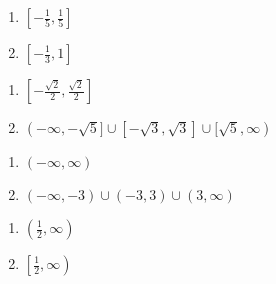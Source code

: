 \documentclass{ximera}
\begin{document}
\begin{multicols}{2}

\begin{enumerate}

\setcounter{enumi}{\value{HW}}

\item  $\left[-\frac{1}{5}, \frac{1}{5}\right]$
\item  $\left[-\frac{1}{3}, 1 \right]$

\setcounter{HW}{\value{enumi}}

\end{enumerate}

\end{multicols}

\begin{multicols}{2}

\begin{enumerate}

\setcounter{enumi}{\value{HW}}

\item   $\left[-\frac{\sqrt{2}}{2}, \frac{\sqrt{2}}{2}\right]$ 
\item  $(-\infty, -\sqrt{5}] \cup [-\sqrt{3}, \sqrt{3}] \cup [\sqrt{5}, \infty)$ 

\setcounter{HW}{\value{enumi}}

\end{enumerate}

\end{multicols}

\begin{multicols}{2}

\begin{enumerate}

\setcounter{enumi}{\value{HW}}

\item $(-\infty, \infty)$
\item  $(-\infty, -3) \cup (-3,3) \cup (3, \infty)$

\setcounter{HW}{\value{enumi}}

\end{enumerate}

\end{multicols}

\begin{multicols}{2}

\begin{enumerate}

\setcounter{enumi}{\value{HW}}

\item  $\left(\frac{1}{2}, \infty \right)$
\item  $\left[\frac{1}{2}, \infty \right)$

\setcounter{HW}{\value{enumi}}

\end{enumerate}

\end{multicols}
\end{document}
